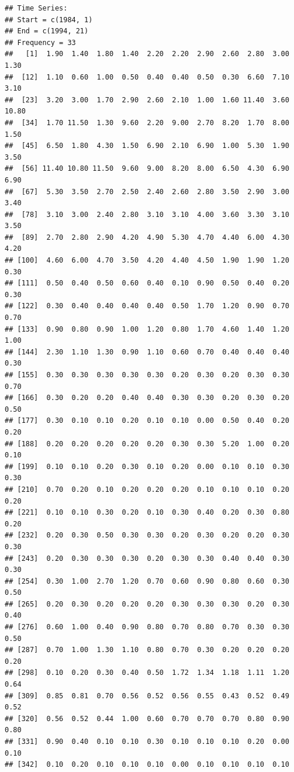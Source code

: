 \documentclass[12pt,]{article}
\newenvironment{Shaded}{\begin{snugshade}}{\end{snugshade}}
\newcommand{\KeywordTok}[1]{\textcolor[rgb]{0.13,0.29,0.53}{\textbf{#1}}}
\newcommand{\DataTypeTok}[1]{\textcolor[rgb]{0.13,0.29,0.53}{#1}}
\newcommand{\DecValTok}[1]{\textcolor[rgb]{0.00,0.00,0.81}{#1}}
\newcommand{\StringTok}[1]{\textcolor[rgb]{0.31,0.60,0.02}{#1}}
\newcommand{\OperatorTok}[1]{\textcolor[rgb]{0.81,0.36,0.00}{\textbf{#1}}}
\newcommand{\NormalTok}[1]{#1}
\begin{document}
\begin{Shaded}
\end{Shaded}

\begin{verbatim}
## Time Series:
## Start = c(1984, 1) 
## End = c(1994, 21) 
## Frequency = 33 
##   [1]  1.90  1.40  1.80  1.40  2.20  2.20  2.90  2.60  2.80  3.00  1.30
##  [12]  1.10  0.60  1.00  0.50  0.40  0.40  0.50  0.30  6.60  7.10  3.10
##  [23]  3.20  3.00  1.70  2.90  2.60  2.10  1.00  1.60 11.40  3.60 10.80
##  [34]  1.70 11.50  1.30  9.60  2.20  9.00  2.70  8.20  1.70  8.00  1.50
##  [45]  6.50  1.80  4.30  1.50  6.90  2.10  6.90  1.00  5.30  1.90  3.50
##  [56] 11.40 10.80 11.50  9.60  9.00  8.20  8.00  6.50  4.30  6.90  6.90
##  [67]  5.30  3.50  2.70  2.50  2.40  2.60  2.80  3.50  2.90  3.00  3.40
##  [78]  3.10  3.00  2.40  2.80  3.10  3.10  4.00  3.60  3.30  3.10  3.50
##  [89]  2.70  2.80  2.90  4.20  4.90  5.30  4.70  4.40  6.00  4.30  4.20
## [100]  4.60  6.00  4.70  3.50  4.20  4.40  4.50  1.90  1.90  1.20  0.30
## [111]  0.50  0.40  0.50  0.60  0.40  0.10  0.90  0.50  0.40  0.20  0.30
## [122]  0.30  0.40  0.40  0.40  0.40  0.50  1.70  1.20  0.90  0.70  0.70
## [133]  0.90  0.80  0.90  1.00  1.20  0.80  1.70  4.60  1.40  1.20  1.00
## [144]  2.30  1.10  1.30  0.90  1.10  0.60  0.70  0.40  0.40  0.40  0.30
## [155]  0.30  0.30  0.30  0.30  0.30  0.20  0.30  0.20  0.30  0.30  0.70
## [166]  0.30  0.20  0.20  0.40  0.40  0.30  0.30  0.20  0.30  0.20  0.50
## [177]  0.30  0.10  0.10  0.20  0.10  0.10  0.00  0.50  0.40  0.20  0.20
## [188]  0.20  0.20  0.20  0.20  0.20  0.30  0.30  5.20  1.00  0.20  0.10
## [199]  0.10  0.10  0.20  0.30  0.10  0.20  0.00  0.10  0.10  0.30  0.30
## [210]  0.70  0.20  0.10  0.20  0.20  0.20  0.10  0.10  0.10  0.20  0.20
## [221]  0.10  0.10  0.30  0.20  0.10  0.30  0.40  0.20  0.30  0.80  0.20
## [232]  0.20  0.30  0.50  0.30  0.30  0.20  0.30  0.20  0.20  0.30  0.30
## [243]  0.20  0.30  0.30  0.30  0.20  0.30  0.30  0.40  0.40  0.30  0.30
## [254]  0.30  1.00  2.70  1.20  0.70  0.60  0.90  0.80  0.60  0.30  0.50
## [265]  0.20  0.30  0.20  0.20  0.20  0.30  0.30  0.30  0.20  0.30  0.40
## [276]  0.60  1.00  0.40  0.90  0.80  0.70  0.80  0.70  0.30  0.30  0.50
## [287]  0.70  1.00  1.30  1.10  0.80  0.70  0.30  0.20  0.20  0.20  0.20
## [298]  0.10  0.20  0.30  0.40  0.50  1.72  1.34  1.18  1.11  1.20  0.64
## [309]  0.85  0.81  0.70  0.56  0.52  0.56  0.55  0.43  0.52  0.49  0.52
## [320]  0.56  0.52  0.44  1.00  0.60  0.70  0.70  0.70  0.80  0.90  0.80
## [331]  0.90  0.40  0.10  0.10  0.30  0.10  0.10  0.10  0.20  0.00  0.10
## [342]  0.10  0.20  0.10  0.10  0.10  0.00  0.10  0.10  0.10  0.10
\end{verbatim}
\end{document}

